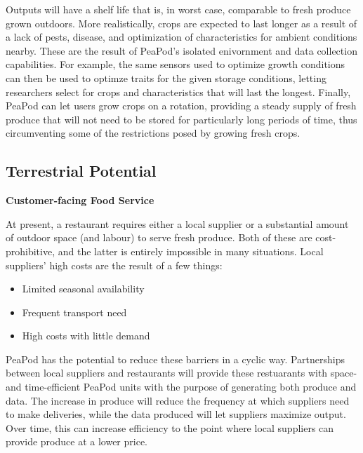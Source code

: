 \documentclass{report}
\begin{document}
Outputs will have a shelf life that is, in worst case, comparable to fresh produce grown outdoors. More realistically, crops are expected to last longer as a result of a lack of pests, disease, and optimization of characteristics for ambient conditions nearby. These are the result of PeaPod's isolated enivornment and data collection capabilities. For example, the same sensors used to optimize growth conditions can then be used to optimze traits for the given storage conditions, letting researchers select for crops and characteristics that will last the longest. Finally, PeaPod can let users grow crops on a rotation, providing a steady supply of fresh produce that will not need to be stored for particularly long periods of time, thus circumventing some of the restrictions posed by growing fresh crops.


\subsection{Terrestrial Potential}




\textbf{Customer-facing Food Service} %

At present, a restaurant requires either a local supplier or a substantial amount of outdoor space (and labour) to serve fresh produce. Both of these are cost-prohibitive, and the latter is entirely impossible in many situations. Local suppliers' high costs are the result of a few things:
\begin{itemize}
    \item Limited seasonal availability
    \item Frequent transport need
    \item High costs with little demand
\end{itemize}
PeaPod has the potential to reduce these barriers in a cyclic way. Partnerships between local suppliers and restaurants will provide these restuarants with space- and time-efficient PeaPod units with the purpose of generating both produce and data. The increase in produce will reduce the frequency at which suppliers need to make deliveries, while the data produced will let suppliers maximize output. Over time, this can increase efficiency to the point where local suppliers can provide produce at a lower price.
\end{document}
